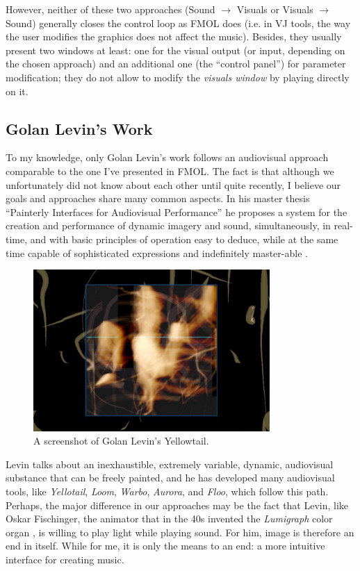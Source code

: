 However, neither of these two approaches (Sound $\rightarrow$ Visuals  or Visuals
$\rightarrow$ Sound)  generally  closes  the  control  loop  as FMOL does
(i.e. in VJ tools, the way the user modifies the graphics does not affect the
music). Besides, they usually present two  windows  at least:  one  for the 
visual  output  (or input, depending on the chosen approach)  and  an additional
one (the ``control panel'') for parameter modification; they do not allow to
modify the \textit{visuals window} by playing directly on it.

\subsection{Golan Levin's Work}

To my knowledge, only Golan Levin's work follows an audiovisual approach
comparable to the one I've presented in FMOL. The fact is that  although  we
unfortunately  did not know about each other until quite recently, I believe
our goals and approaches share many common aspects.  In  his  master thesis
``Painterly Interfaces for Audiovisual Performance'' he proposes a system for the
creation and performance of dynamic imagery and sound, simultaneously, in
real-time, and with basic principles of operation easy to deduce, while at the
same time capable of sophisticated expressions and indefinitely master-able \cite{Levin:2000}.

\begin{figure}[t]
\centering
\includegraphics[width=9cm]{jorda-fig5.png}
\caption{A screenshot  of Golan Levin's Yellowtail.}
\label{Jorda:fig:yellowtail} 
\end{figure}

Levin talks about an inexhaustible, extremely variable, dynamic, audiovisual
substance that can be freely painted, and he  has  developed  many  audiovisual  
tools,  like  \textit{Yellotail}, \textit{Loom}, \textit{Warbo}, \textit{Aurora},  and  \textit{Floo}, which  follow  this  path. Perhaps, the major difference in our approaches may be the fact that Levin, like Oskar Fischinger, the animator that in the 40s invented the \textit{Lumigraph} color organ \cite{Moritz:1997}, is willing to play light while playing sound.  For him, image is therefore an end in itself. While for me, it is only  the means to an end: a
more intuitive interface for creating music.

